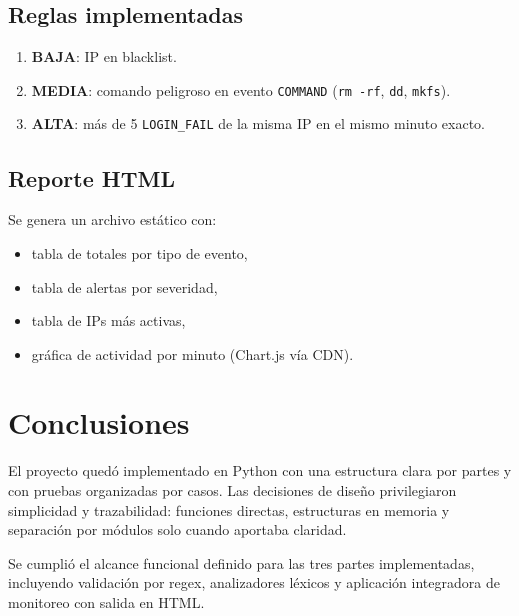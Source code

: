 \documentclass[12pt]{article}
\begin{document}
\subsection{Reglas implementadas}
\begin{enumerate}[leftmargin=*]
    \item \textbf{BAJA}: IP en blacklist.
    \item \textbf{MEDIA}: comando peligroso en evento \texttt{COMMAND} (\texttt{rm -rf}, \texttt{dd}, \texttt{mkfs}).
    \item \textbf{ALTA}: más de 5 \texttt{LOGIN\_FAIL} de la misma IP en el mismo minuto exacto.
\end{enumerate}

\subsection{Reporte HTML}
Se genera un archivo estático con:
\begin{itemize}[leftmargin=*]
    \item tabla de totales por tipo de evento,
    \item tabla de alertas por severidad,
    \item tabla de IPs más activas,
    \item gráfica de actividad por minuto (Chart.js vía CDN).
\end{itemize}

\section{Conclusiones}
El proyecto quedó implementado en Python con una estructura clara por partes y con pruebas organizadas por casos.
Las decisiones de diseño privilegiaron simplicidad y trazabilidad: funciones directas, estructuras en memoria y separación por módulos solo cuando aportaba claridad.

Se cumplió el alcance funcional definido para las tres partes implementadas, incluyendo validación por regex, analizadores léxicos y aplicación integradora de monitoreo con salida en HTML.
\end{document}
